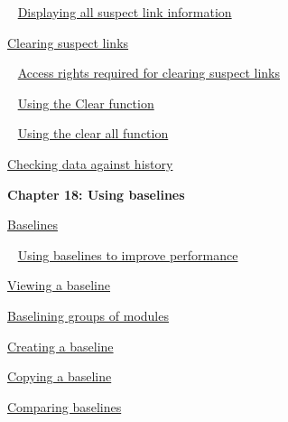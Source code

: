\documentclass[11pt,a4paper]{article}
\begin{document}
\,\,\, \href{https://www.ibm.com/support/knowledgecenter/search/Displaying%20all%20suspect%20link%20information?scope=SSYQBZ_9.6.1}{Displaying all suspect link information}

\href{https://www.ibm.com/support/knowledgecenter/search/Clearing%20suspect%20links?scope=SSYQBZ_9.6.1}{Clearing suspect links}

\,\,\, \href{https://www.ibm.com/support/knowledgecenter/search/Access%20rights%20required%20for%20clearing%20suspect%20links?scope=SSYQBZ_9.6.1}{Access rights required for clearing suspect links}

\,\,\, \href{https://www.ibm.com/support/knowledgecenter/search/Using%20the%20Clear%20function?scope=SSYQBZ_9.6.1}{Using the Clear function}

\,\,\, \href{https://www.ibm.com/support/knowledgecenter/search/Using%20the%20clear%20all%20function?scope=SSYQBZ_9.6.1}{Using the clear all function}

\href{https://www.ibm.com/support/knowledgecenter/search/Checking%20data%20against%20history?scope=SSYQBZ_9.6.1}{Checking data against history} \\



\begin{Large}\textbf{Chapter 18: Using baselines} \end{Large} 
\vspace{1mm}

\href{https://www.ibm.com/support/knowledgecenter/search/Baselines?scope=SSYQBZ_9.6.1}{Baselines}

\,\,\, \href{https://www.ibm.com/support/knowledgecenter/search/Using%20baselines%20to%20improve%20performance?scope=SSYQBZ_9.6.1}{Using baselines to improve performance}

\href{https://www.ibm.com/support/knowledgecenter/search/Viewing%20a%20baseline?scope=SSYQBZ_9.6.1}{Viewing a baseline}

\href{https://www.ibm.com/support/knowledgecenter/search/Baselining%20groups%20of%20modules?scope=SSYQBZ_9.6.1}{Baselining groups of modules}

\href{https://www.ibm.com/support/knowledgecenter/search/Creating%20a%20baseline?scope=SSYQBZ_9.6.1}{Creating a baseline}

\href{https://www.ibm.com/support/knowledgecenter/search/Copying%20a%20baseline?scope=SSYQBZ_9.6.1}{Copying a baseline}

\href{https://www.ibm.com/support/knowledgecenter/search/Comparing%20baselines?scope=SSYQBZ_9.6.1}{Comparing baselines}
\end{document}
